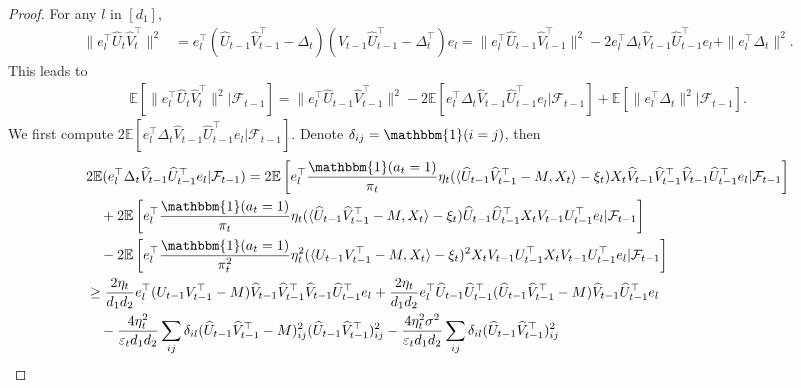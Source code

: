 \documentclass[12pt]{article}
\newcommand{\inp}[2]{\langle #1,#2\rangle}
\def\EE{{\mathbb E}}
\theoremstyle{plain}
\begin{document}
\begin{proof}
    For any $l$ in $[d_1]$,
\begin{align*}
    \|e_l^{\top}\widehat{U}_t\widehat{V}_t^{\top}\|^2 &= e_l^{\top} (\widehat{U}_{t-1}\widehat{V}_{t-1}^{\top}-\Delta_{t})(\widehat{V}_{t-1}\widehat{U}_{t-1}^{\top} - \Delta_{t}^{\top})e_l = \|e_l^{\top}\widehat{U}_{t-1}\widehat{V}_{t-1}^{\top}\|^2 - 2e_l^{\top}\Delta_{t}\widehat{V}_{t-1}\widehat{U}_{t-1}^{\top}e_l + \|e_l^{\top}\Delta_{t}\|^2.
\end{align*}
This leads to
\begin{align*}
    \EE[\|e_l^{\top}\widehat{U}_t\widehat{V}_t^{\top}\|^2|\mathcal{F}_{t-1}]= \|e_l^{\top}\widehat{U}_{t-1}\widehat{V}_{t-1}^{\top}\|^2 - 2\EE[e_l^{\top}\Delta_{t}\widehat{V}_{t-1}\widehat{U}_{t-1}^{\top}e_l|\mathcal{F}_{t-1}] + \EE[\|e_l^{\top}\Delta_{t}\|^2|\mathcal{F}_{t-1}].
\end{align*}
We first compute $2\EE[e_l^{\top}\Delta_{t}\widehat{V}_{t-1}\widehat{U}_{t-1}^{\top}e_l|\mathcal{F}_{t-1}]$. Denote $\delta_{ij}=\mathbbm{1}(i=j)$, then 
\begin{align*}
    &2\EE(e_l^{\top}\Delta_{t}\widehat{V}_{t-1}\widehat{U}_{t-1}^{\top}e_l|\mathcal{F}_{t-1})= 2\EE\left[e_l^{\top} \frac{\mathbbm{1}(a_t=1)}{\pi_t}\eta_t(\inp{\widehat{U}_{t-1}\widehat{V}_{t-1}^{\top} - M}{X_t}-\xi_t)X_t\widehat{V}_{t-1}\widehat{V}_{t-1}^{\top} \widehat{V}_{t-1}\widehat{U}_{t-1}^{\top}e_l|\mathcal{F}_{t-1}\right] \\ &\quad + 2\EE\left[e_l^{\top} \frac{\mathbbm{1}(a_t=1)}{\pi_t}\eta_t(\inp{\widehat{U}_{t-1}\widehat{V}_{t-1}^{\top}- M}{X_t}-\xi_t)\widehat{U}_{t-1}\widehat{U}_{t-1}^{\top}X_t V_{t-1}U_{t-1}^{\top}e_l|\mathcal{F}_{t-1}\right] \\ &\quad - 2\EE\left[e_l^{\top} \frac{\mathbbm{1}(a_t=1)}{\pi_t^2}\eta_t^2(\inp{U_{t-1}V_{t-1}^{\top}- M}{X_t}-\xi_t)^2X_tV_{t-1}U_{t-1}^{\top}X_t V_{t-1}U_{t-1}^{\top}e_l|\mathcal{F}_{t-1}\right] \\
    &\geq \frac{2\eta_t}{d_1d_2}e_l^{\top}(U_{t-1}V_{t-1}^{\top} - M)\widehat{V}_{t-1}\widehat{V}_{t-1}^{\top}\widehat{V}_{t-1}\widehat{U}_{t-1}^{\top}e_l  + \frac{2\eta_t}{d_1d_2}e_l^{\top}\widehat{U}_{t-1}\widehat{U}_{t-1}^{\top}(\widehat{U}_{t-1}\widehat{V}_{t-1}^{\top} - M)\widehat{V}_{t-1}\widehat{U}_{t-1}^{\top}e_l \\ &\quad - \frac{4\eta_t^2}{\varepsilon_t d_1d_2}\sum_{ij}\delta_{il}(\widehat{U}_{t-1}\widehat{V}_{t-1}^{\top} - M)_{ij}^2(\widehat{U}_{t-1}\widehat{V}_{t-1}^{\top})_{ij}^2 - \frac{4\eta_t^2\sigma^2}{\varepsilon_t d_1d_2}\sum_{ij}\delta_{il}(\widehat{U}_{t-1}\widehat{V}_{t-1}^{\top})_{ij}^2 \\

\end{align*}
\end{proof}
\end{document}
